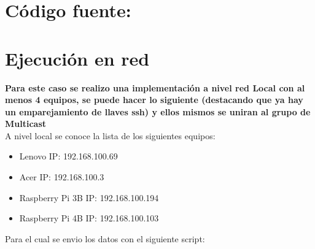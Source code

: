 \documentclass[10pt,executivepaper]{article}
\begin{document}
\section{Código fuente:}
\begin{center}
  
  
\end{center}
\section{Ejecución en red}
\textbf{Para este caso se realizo una implementación a nivel red Local con al menos 4 equipos, se puede hacer lo siguiente (destacando que ya hay un emparejamiento de llaves ssh) y ellos mismos se uniran al grupo de Multicast}\\
A nivel local se conoce la lista de los siguientes equipos:
\begin{itemize}
  \item Lenovo IP: 192.168.100.69
  \item Acer IP: 192.168.100.3
  \item Raspberry Pi 3B IP: 192.168.100.194
  \item Raspberry Pi 4B IP: 192.168.100.103
\end{itemize}
Para el cual se envio los datos con el siguiente script:
\begin{center}
  
\end{center}
\end{document}
